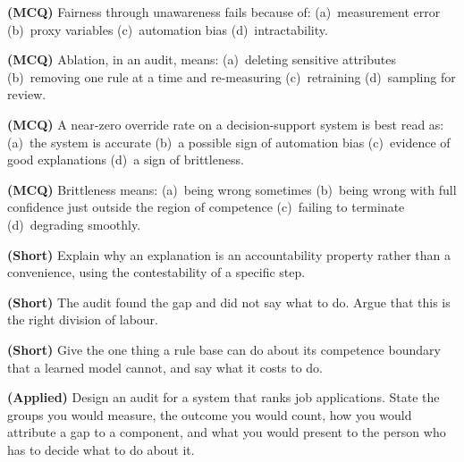 \begin{reviewq}
  \item \textbf{(MCQ)} Fairness through unawareness fails because of:
        (a)~measurement error (b)~proxy variables (c)~automation bias
        (d)~intractability.
  \item \textbf{(MCQ)} Ablation, in an audit, means: (a)~deleting sensitive
        attributes (b)~removing one rule at a time and re-measuring
        (c)~retraining (d)~sampling for review.
  \item \textbf{(MCQ)} A near-zero override rate on a decision-support system is
        best read as: (a)~the system is accurate (b)~a possible sign of automation
        bias (c)~evidence of good explanations (d)~a sign of brittleness.
  \item \textbf{(MCQ)} Brittleness means: (a)~being wrong sometimes (b)~being wrong
        with full confidence just outside the region of competence
        (c)~failing to terminate (d)~degrading smoothly.
  \item \textbf{(Short)} Explain why an explanation is an accountability property
        rather than a convenience, using the contestability of a specific step.
  \item \textbf{(Short)} The audit found the gap and did not say what to do. Argue
        that this is the right division of labour.
  \item \textbf{(Short)} Give the one thing a rule base can do about its competence
        boundary that a learned model cannot, and say what it costs to do.
  \item \textbf{(Applied)} Design an audit for a system that ranks job applications.
        State the groups you would measure, the outcome you would count, how you
        would attribute a gap to a component, and what you would present to the
        person who has to decide what to do about it.
\end{reviewq}

